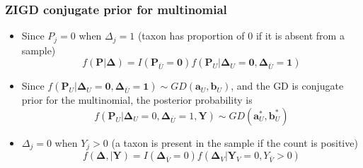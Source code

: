 \documentclass{beamer}
\begin{document}
\begin{frame}
\frametitle{ZIGD conjugate prior for multinomial}
\begin{itemize}
  \item Since $P_j = 0$ when $\Delta_j = 1$ (taxon has proportion of 0 if it is absent from a sample)
  $$f(\bm{P} |\boldsymbol\Delta ) = I(\bm{P}_{\bar U} = \bm{0})f(\bm{P}_U | \boldsymbol\Delta_{U} = \bm{0}, \boldsymbol\Delta_{\bar U} = \bm{1})$$
  \item Since $f(\bm{P}_U | \boldsymbol\Delta_{U} = \bm{0}, \boldsymbol\Delta_{\bar U} = \bm{1}) \sim GD(\bm{a}_U, \bm{b}_U)$, and the GD is conjugate prior for the multinomial, the posterior probability is
  $$ f(\bm{P}_U|\boldsymbol\Delta_U = 0, \boldsymbol\Delta_{\bar U} = 1, \bm{Y}) \sim GD(\bm{a}_U^*, \bm{b}_U^*)$$
  \item  $\Delta_j = 0$ when $Y_j > 0$ (a taxon is present in the sample if the count is positive)
  $$ f(\boldsymbol\Delta, | \bm{Y}) = I(\boldsymbol\Delta_{\bar{V}} = 0)f(\boldsymbol\Delta_V| \bm{Y}_V = 0, Y_{\bar V} > 0)$$
\end{itemize}

\end{frame}
\end{document}
